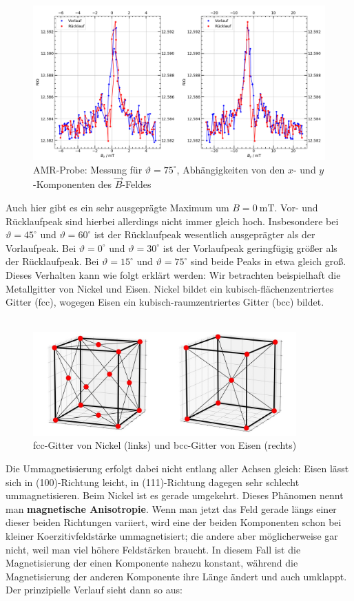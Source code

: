 \documentclass[german,  %
parskip=full,  %
]{scrartcl}
\begin{document}
\newpage
\begin{figure}[h!]\centering
\includegraphics[width=\textwidth]{Probe3_75_Grad.png}
\caption{AMR-Probe: Messung für \(\vartheta=75^{\circ}\), Abhängigkeiten von den \(x\)- und \(y\)-Komponenten des \(\vec{B}\)-Feldes}
\end{figure}  
Auch hier gibt es ein sehr ausgeprägte Maximum um \(B=0 \ \mathrm{mT}\). Vor- und Rücklaufpeak sind hierbei allerdings nicht immer gleich hoch. Insbesondere bei \(\vartheta=45^{\circ}\) und \(\vartheta= 60^{\circ}\) ist der Rücklaufpeak wesentlich ausgeprägter als der Vorlaufpeak. Bei \(\vartheta= 0^{\circ}\) und \(\vartheta=30^{\circ}\) ist der Vorlaufpeak geringfügig größer als der Rücklaufpeak. Bei \(\vartheta=15^{\circ}\) und \(\vartheta=75^{\circ}\) sind beide Peaks in etwa gleich groß. Dieses Verhalten kann wie folgt erklärt werden: Wir betrachten beispielhaft die Metallgitter von Nickel und Eisen. Nickel bildet ein kubisch-flächenzentriertes Gitter (fcc), wogegen Eisen ein kubisch-raumzentriertes Gitter (bcc) bildet. \\\\
\begin{figure}[h!]\centering
\includegraphics[width=0.9\textwidth]{fcc_und_bcc_Gitter.jpg}
\caption{fcc-Gitter von Nickel (links) und bcc-Gitter von Eisen (rechts)}
\end{figure} 
\newpage
Die Ummagnetisierung erfolgt dabei nicht entlang aller Achsen gleich: Eisen lässt sich in (100)-Richtung leicht, in (111)-Richtung dagegen sehr schlecht ummagnetisieren. Beim Nickel ist es gerade umgekehrt. Dieses Phänomen nennt man \textbf{magnetische Anisotropie}. Wenn man jetzt das Feld gerade längs einer dieser beiden Richtungen variiert, wird eine der beiden Komponenten schon bei kleiner Koerzitivfeldstärke ummagnetisiert; die andere aber möglicherweise gar nicht, weil man viel höhere Feldstärken braucht. In diesem Fall ist die Magnetisierung der einen Komponente nahezu konstant, während die Magnetisierung der anderen Komponente ihre Länge ändert und auch umklappt. Der prinzipielle Verlauf sieht dann so aus: \\\\
\end{document}
